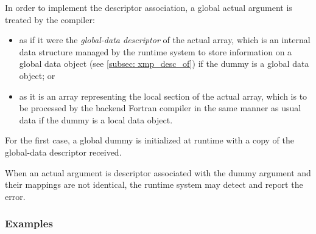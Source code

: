 In order to implement the descriptor association, a global actual
argument is treated by the {\XMP} compiler:

\begin{itemize}
 \item as if it were the {\it global-data descriptor} of the actual array, 
       which is an internal data structure managed by the {\XMP} runtime
       system to store information on a global data object (see \ref{subsec:
       xmp_desc_of}) if the dummy is a global data object; or
 \item as it is an array representing the local section of the actual
       array, which is to be processed by the backend Fortran compiler
       in the same manner as usual data if the dummy is a local data object.
\end{itemize}

For the first case, a global dummy is initialized at runtime with a copy
of the global-data descriptor received.

When an actual argument is descriptor associated with the dummy argument
and their mappings are not identical, the {\XMP} runtime system may
detect and report the error.

\subsubsection*{Examples}

